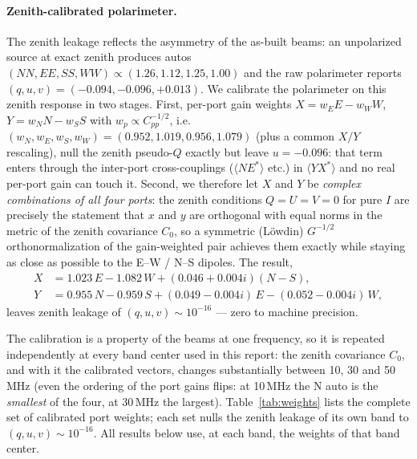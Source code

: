\documentclass[11pt]{article}
\begin{document}
\paragraph{Zenith-calibrated polarimeter.}
The zenith leakage reflects the asymmetry of the as-built beams: an
unpolarized source at exact zenith produces autos
$(NN, EE, SS, WW) \propto (1.26, 1.12, 1.25, 1.00)$ and the raw
polarimeter reports $(q, u, v) = (-0.094, -0.096, +0.013)$.  We
calibrate the polarimeter on this zenith response in two stages.
First, per-port gain weights $X = w_E E - w_W W$,
$Y = w_N N - w_S S$ with $w_p \propto C_{pp}^{-1/2}$, i.e.\
$(w_N, w_E, w_S, w_W) = (0.952, 1.019, 0.956, 1.079)$ (plus a common
$X/Y$ rescaling), null the zenith pseudo-$Q$ exactly but leave
$u = -0.096$: that term enters through the inter-port
cross-couplings ($\langle N E^* \rangle$ etc.) in
$\langle Y X^* \rangle$ and no real per-port gain can touch it.
Second, we therefore let $X$ and $Y$ be \emph{complex combinations of
all four ports}: the zenith conditions $Q = U = V = 0$ for pure $I$
are precisely the statement that $x$ and $y$ are orthogonal with
equal norms in the metric of the zenith covariance $C_0$, so a
symmetric (L\"owdin) $G^{-1/2}$ orthonormalization of the
gain-weighted pair achieves them exactly while staying as close as
possible to the E--W / N--S dipoles.  The result,
\begin{align}
  X &= 1.023\,E - 1.082\,W + (0.046 + 0.004i)(N - S),\nonumber\\
  Y &= 0.955\,N - 0.959\,S + (0.049 - 0.004i)\,E
      - (0.052 - 0.004i)\,W,\nonumber
\end{align}
leaves zenith leakage of $(q, u, v) \sim 10^{-16}$ — zero to machine
precision.

The calibration is a property of the beams at one frequency, so it is
repeated independently at every band center used in this report: the
zenith covariance $C_0$, and with it the calibrated vectors, changes
substantially between 10, 30 and 50\,MHz (even the ordering of the
port gains flips: at 10\,MHz the N auto is the \emph{smallest} of the
four, at 30\,MHz the largest).  Table~\ref{tab:weights} lists the
complete set of calibrated port weights; each set nulls the zenith
leakage of its own band to $(q, u, v) \sim 10^{-16}$.  All results
below use, at each band, the weights of that band center.
\end{document}
